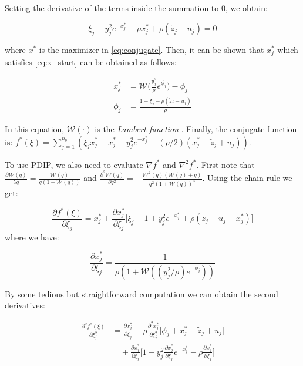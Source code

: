 \documentclass[letterpaper]{article} %
\begin{document}
Setting the derivative of the terms inside the summation to 0, we obtain:

\begin{equation}
\xi_j-y_j^2e^{-x_j^*}-\rho x_j^* + \rho (\tilde{z}_j-u_j)=0
\label{eq:x_start}
\end{equation}

\noindent where $x^*$ is the maximizer in \ref{eq:conjugate}. Then, it can be shown that $x_j^*$ which satisfies \eqref{eq:x_start} can be obtained as follows:

\begin{align}
x^*_j & = \mathscr{W}\bigg(\frac{y_j^2}{\rho} e^{\phi_j} \bigg) - \phi_j \\
\phi_j & =\frac{1-\xi_j-\rho(\tilde{z}_j-u_j)}{\rho}
\end{align}

In this equation, $\mathscr{W}(\cdot)$ is the \textit{Lambert function} \cite{corless_lambertw_1996}. Finally, the conjugate function is: $f^*(\xi) = \sum_{j=1}^{n_b} (\xi_jx^*_j - x^*_j - y_j^2e^{-x^*_j} - (\rho/2)(x^*_j-\tilde{z}_j+u_j))$.

To use PDIP, we also need to evaluate $\nabla f^*$ and $\nabla^2 f^*$. First note that $\frac{\partial \mathscr{W}(q)}{\partial q} = \frac{\mathscr{W}(q)}{q(1+\mathscr{W}(q))}$ and $\frac{\partial^2 \mathscr{W}(q)}{\partial q^2} = - \frac{\mathscr{W}^2(q)(\mathscr{W}(q)+q)}{q^2(1+\mathscr{W}(q))^3}$. Using the chain rule we get:


\begin{equation}
\frac{\partial f^*(\xi)}{\partial \xi_j}  =  x^*_j  + \frac{\partial x^*_j}{\partial \xi_j} \bigg[ \xi_j -1 + y_j^2 e^{-x_j^*} + \rho (\tilde{z}_j - u_j - x_j^*) \bigg]
\label{eq:d_f*_start}
\end{equation}
where we have:

\begin{equation}
\frac{\partial x_j^*}{\partial \xi_j}  = \frac{1}{\rho(1+\mathscr{W}((y_j^2/\rho) e^{-\phi_j} ))}
\label{eq:d_x*_start}
\end{equation}

By some tedious but straightforward computation we can obtain the second derivatives:


\begin{align}
\frac{\partial^2 f^*(\xi)}{\partial \xi_j^2} & =  \frac{\partial x_j^*}{\partial \xi_j} - \rho \frac{\partial^2 x_j^*}{\partial \xi_j^2} \bigg[ \phi_j +x_j^* - \tilde{z}_j + u_j \bigg]\\
& \quad + \frac{\partial x_j^*}{\partial \xi_j} \bigg[ 1-y_j^2 \frac{\partial x_j^*}{\partial \xi_j} e^{-x_j^*} -\rho \frac{\partial x_j^*}{\partial \xi_j} \bigg]
\label{eq:d2_f*_start}
\end{align}
\end{document}
